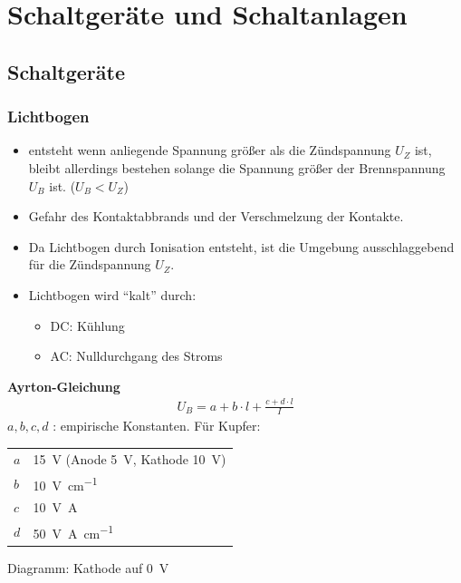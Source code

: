 \section{Schaltgeräte und Schaltanlagen}
\subsection{Schaltgeräte}

    \subsubsection{Lichtbogen}
        \begin{itemize}
            \item entsteht wenn anliegende Spannung größer als die Zündspannung \(U_Z\) ist, 
                bleibt allerdings bestehen solange die Spannung größer der Brennspannung \(U_B\) ist. (\(U_B < U_Z\))
            \item Gefahr des Kontaktabbrands und der Verschmelzung der Kontakte.
            \item Da Lichtbogen durch Ionisation entsteht, ist die Umgebung ausschlaggebend für die Zündspannung \(U_Z\). 
            \item Lichtbogen wird ``kalt'' durch:
                \begin{itemize}
                    \item DC: Kühlung
                    \item AC: Nulldurchgang des Stroms
                \end{itemize}
        \end{itemize}
        
        \textbf{Ayrton-Gleichung}
        \begin{align*}
            U_B = a + b \cdot l + \frac{c + d \cdot l}{I}
        \end{align*}
        \(a, b, c, d\) : empirische Konstanten. Für Kupfer:
        \vspace{-10pt}
        \begin{table}[H]
            \begin{tabular}{l l}
                \toprule
                \(a\) & \SI{15}{\volt}  (Anode \SI{5}{\volt}, Kathode \SI{10}{\volt}) \\
                \(b\) & \SI{10}{\volt\per\centi\meter} \\
                \(c\) & \SI{10}{\volt\ampere} \\
                \(d\) & \SI{50}{\volt\ampere\per\centi\meter} \\
                \bottomrule
            \end{tabular}
        \end{table}
        \vspace{-12pt}
        {\small Diagramm: Kathode auf \SI{0}{\volt}}

